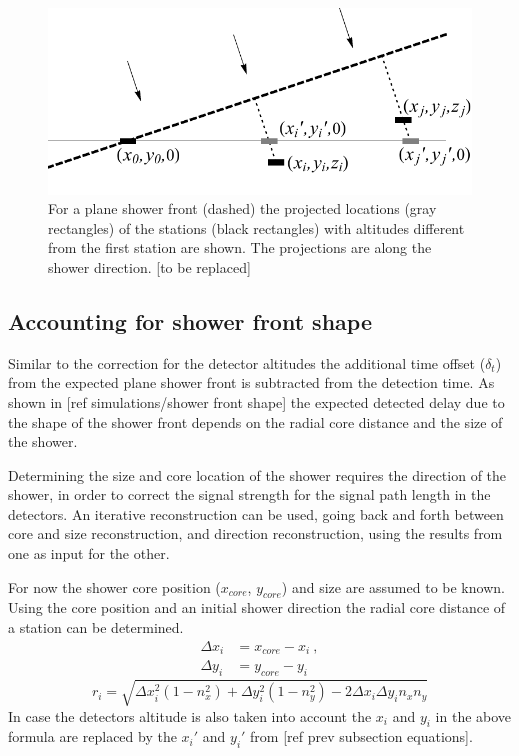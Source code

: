 \begin{figure}
    \centering
    \includegraphics[width=0.7\linewidth]{plots/reconstructions/approxfront.pdf}
    \caption{For a plane shower front (dashed) the projected locations (gray rectangles) of the stations (black rectangles) with altitudes different from the first station are shown. The projections are along the shower direction. [to be replaced]}
    \label{fig:altitude_projection}
\end{figure}


\subsection{Accounting for shower front shape}

Similar to the correction for the detector altitudes the additional time offset ($\delta_t$) from the expected plane shower front is subtracted from the detection time.  As shown in [ref simulations/shower front shape] the expected detected delay due to the shape of the shower front depends on the radial core distance and the size of the shower.

Determining the size and core location of the shower requires the direction of the shower, in order to correct the signal strength for the signal path length in the detectors. An iterative reconstruction can be used, going back and forth between core and size reconstruction, and direction reconstruction, using the results from one as input for the other.

For now the shower core position ($x_{core}$, $y_{core}$) and size are assumed to be known. Using the core position and an initial shower direction the radial core distance of a station can be determined.
%
\begin{equation}
    \begin{align}
        \Delta x_i &= x_{core} - x_i \ , \\
        \Delta y_i &= y_{core} - y_i
    \end{align}
\end{equation}
%
\begin{equation}
    r_i = \sqrt{\Delta x_i^2 (1 - n_x^2) + \Delta y_i^2 (1 - n_y^2) -
                2 \Delta x_i \Delta y_i n_x n_y}
\end{equation}
%
In case the detectors altitude is also taken into account the $x_i$ and $y_i$ in the above formula are replaced by the $x_i'$ and $y_i'$ from [ref prev subsection equations].

